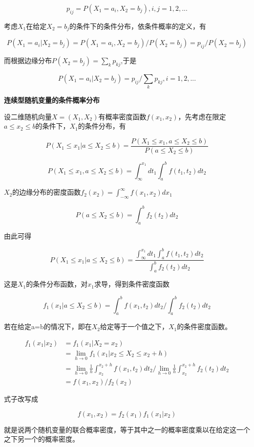 \documentclass{ctexart}
\begin{document}
	\[p_{ij}=P(X_1=a_i,X_2=b_j), i,j=1,2,...\]
	
	考虑\(X_1\)在给定\(X_2=b_j\)的条件下的条件分布，依条件概率的定义，有
	
	\[P(X_1=a_i|X_2=b_j)=P(X_1=a_i, X_2=b_j)/P(X_2=b_j)=p_{ij}/P(X_2=b_j)\]
	
	而根据边缘分布\(P(X_2=b_j)=\sum_{k}p_{kj}\),于是
	
	\[P(X_1=a_i|X_2=b_j)=p_{ij}/\sum_{k}p_{kj}, i=1,2,...\]
	
	\mbox{}
	
	\textbf{连续型随机变量的条件概率分布}
	
	设二维随机向量\(X=(X_1,X_2)\)有概率密度函数\(f(x_1,x_2)\)，先考虑在限定\(a \leq x_2 \leq b\)的条件下，\(X_1\)的条件分布，有
	
	\[P(X_1 \leq x_1 | a \leq X_2 \leq b) = \frac{P(X_1 \leq x_1 , a \leq X_2 \leq b)}{P(a \leq X_2 \leq b)}\]
	
	\[P(X_1 \leq x_1 , a \leq X_2 \leq b)=\int_{\infty}^{x_1} dt_1\int_{a}^{b}f(t_1,t_2)dt_2\]
	
	\(X_2\)的边缘分布的密度函数\(f_2(x_2)=\int_{-\infty}^{\infty}f(x_1, x_2)dx_1\)
	
	\[P(a \leq X_2 \leq b) = \int_{a}^{b}f_2(t_2)dt_2\]
	
	由此可得
	
	\[P(X_1 \leq x_1 | a \leq X_2 \leq b)=\frac{\int_{\infty}^{x_1} dt_1\int_{a}^{b}f(t_1,t_2)dt_2}{\int_{a}^{b}f_2(t_2)dt_2}\]
	
	这是\(X_1\)的条件分布函数，对\(x_1\)求导，得到条件密度函数
	
	\[f_1(x_1| a \leq X_2 \leq b)=\int_{a}^{b}f(x_1, t_2)dt_2/\int_{a}^{b}f_2(t_2)dt_2\]
	
	若在给定a=b的情况下，即在\(X_2\)给定等于一个值之下，\(X_1\)的条件密度函数。
	
	\begin{align*}
	f_1(x_1|x_2) &= f_1(x_1|X_2=x_2) \\
					 & = \lim\limits_{h \rightarrow 0}f_1(x_1|x_2 \leq X_2 \leq x_2+h) \\
					 &= \lim\limits_{h \to 0}\frac{1}{h}\int_{x_2}^{x_2+h}f(x_1, t_2)dt_2/\lim\limits_{h \to 0}\frac{1}{h}\int_{x_2}^{x_2+h}f_2(t_2)dt_2 \\
				 	& = f(x_1, x_2)/f_2(x_2)
	\end{align*}
	
	式子改写成
	
	\[f(x_1, x_2)=f_2(x_1)f_1(x_1|x_2)\]
	
	就是说两个随机变量的联合概率密度，等于其中之一的概率密度乘以在给定这一个之下另一个的概率密度。
	
\end{document}
